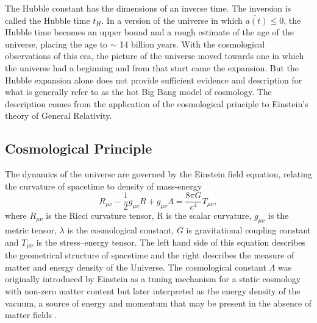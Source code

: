 The Hubble constant has the dimensions of an inverse time. The inversion is called the Hubble time $t_H$. In a version of the universe in which $\ddot{a(t)} \leq 0$, the Hubble time becomes an upper bound and a rough estimate of the age of the universe, placing the age to $\sim$ 14 billion years. With the cosmological observations of this era, the picture of the universe moved towards one in which the universe had a beginning and from that start came the expansion. But the Hubble expansion alone does not provide sufficient evidence and description for what is generally refer to as the hot Big Bang model of cosmology. The description comes from the application of the cosmological principle to Einstein's theory of General Relativity.

\subsection{Cosmological Principle}
\label{subsec:cosmological_principle}

The dynamics of the universe are governed by the Einstein field equation, relating the curvature of spacetime to density of mass-energy \cite{Gravity}
%
\begin{equation}\label{eq:einstein_field_eq}
  R_{\mu\nu} - \frac{1}{2} g_{\mu\nu}R + g_{\mu\nu}\Lambda = \frac{8\pi{}G}{c^4} T_{\mu\nu},
\end{equation}
%
where $R_{\mu\nu}$ is the Ricci curvature tensor, R is the scalar curvature, $g_{\mu\nu}$ is the metric tensor, $\lambda$ is the cosmological constant, $G$ is gravitational coupling constant and $T_{\mu\nu}$ is the stress–energy tensor. The left hand side of this equation describes the geometrical structure of spacetime and the right describes the measure of matter and energy density of the Universe. The cosmological constant $\Lambda$ was originally introduced by Einstein as a tuning mechanism for a static cosmology with non-zero matter content but later interpreted as the energy density of the vacuum, a source of energy and momentum that may be present in the absence of matter fields \cite{SeanC}.

